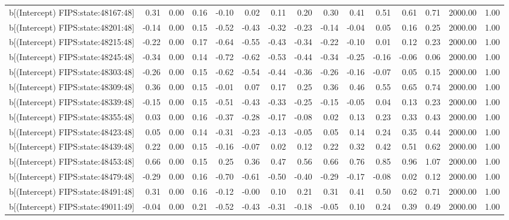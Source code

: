 \begin{table}[ht]
\begin{tabular}{rrrrrrrrrrrrrrr}
  b[(Intercept) FIPS:state:48167:48] & 0.31 & 0.00 & 0.16 & -0.10 & 0.02 & 0.11 & 0.20 & 0.30 & 0.41 & 0.51 & 0.61 & 0.71 & 2000.00 & 1.00 \\ 
  b[(Intercept) FIPS:state:48201:48] & -0.14 & 0.00 & 0.15 & -0.52 & -0.43 & -0.32 & -0.23 & -0.14 & -0.04 & 0.05 & 0.16 & 0.25 & 2000.00 & 1.00 \\ 
  b[(Intercept) FIPS:state:48215:48] & -0.22 & 0.00 & 0.17 & -0.64 & -0.55 & -0.43 & -0.34 & -0.22 & -0.10 & 0.01 & 0.12 & 0.23 & 2000.00 & 1.00 \\ 
  b[(Intercept) FIPS:state:48245:48] & -0.34 & 0.00 & 0.14 & -0.72 & -0.62 & -0.53 & -0.44 & -0.34 & -0.25 & -0.16 & -0.06 & 0.06 & 2000.00 & 1.00 \\ 
  b[(Intercept) FIPS:state:48303:48] & -0.26 & 0.00 & 0.15 & -0.62 & -0.54 & -0.44 & -0.36 & -0.26 & -0.16 & -0.07 & 0.05 & 0.15 & 2000.00 & 1.00 \\ 
  b[(Intercept) FIPS:state:48309:48] & 0.36 & 0.00 & 0.15 & -0.01 & 0.07 & 0.17 & 0.25 & 0.36 & 0.46 & 0.55 & 0.65 & 0.74 & 2000.00 & 1.00 \\ 
  b[(Intercept) FIPS:state:48339:48] & -0.15 & 0.00 & 0.15 & -0.51 & -0.43 & -0.33 & -0.25 & -0.15 & -0.05 & 0.04 & 0.13 & 0.23 & 2000.00 & 1.00 \\ 
  b[(Intercept) FIPS:state:48355:48] & 0.03 & 0.00 & 0.16 & -0.37 & -0.28 & -0.17 & -0.08 & 0.02 & 0.13 & 0.23 & 0.33 & 0.43 & 2000.00 & 1.00 \\ 
  b[(Intercept) FIPS:state:48423:48] & 0.05 & 0.00 & 0.14 & -0.31 & -0.23 & -0.13 & -0.05 & 0.05 & 0.14 & 0.24 & 0.35 & 0.44 & 2000.00 & 1.00 \\ 
  b[(Intercept) FIPS:state:48439:48] & 0.22 & 0.00 & 0.15 & -0.16 & -0.07 & 0.02 & 0.12 & 0.22 & 0.32 & 0.42 & 0.51 & 0.62 & 2000.00 & 1.00 \\ 
  b[(Intercept) FIPS:state:48453:48] & 0.66 & 0.00 & 0.15 & 0.25 & 0.36 & 0.47 & 0.56 & 0.66 & 0.76 & 0.85 & 0.96 & 1.07 & 2000.00 & 1.00 \\ 
  b[(Intercept) FIPS:state:48479:48] & -0.29 & 0.00 & 0.16 & -0.70 & -0.61 & -0.50 & -0.40 & -0.29 & -0.17 & -0.08 & 0.02 & 0.12 & 2000.00 & 1.00 \\ 
  b[(Intercept) FIPS:state:48491:48] & 0.31 & 0.00 & 0.16 & -0.12 & -0.00 & 0.10 & 0.21 & 0.31 & 0.41 & 0.50 & 0.62 & 0.71 & 2000.00 & 1.00 \\ 
  b[(Intercept) FIPS:state:49011:49] & -0.04 & 0.00 & 0.21 & -0.52 & -0.43 & -0.31 & -0.18 & -0.05 & 0.10 & 0.24 & 0.39 & 0.49 & 2000.00 & 1.00 \\ 

\end{tabular}
\end{table}

